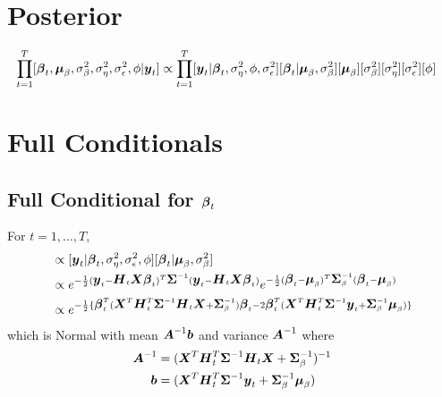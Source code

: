 \documentclass[fleqn]{article}
\def\bm#1{\mbox{\boldmath $#1$}}
\begin{document}
%
\section{Posterior}
%
\begin{align*}
\prod_{t = 1}^T [\bm{\beta}_t, \bm{\mu}_\beta, \sigma^2_\beta, \sigma^2_\eta, \sigma^2_\epsilon, \phi | \bm{y}_t] & \propto \prod_{t = 1}^T [\bm{y}_t | \bm{\beta}_t, \sigma^2_\eta, \phi, \sigma^2_\epsilon] [\bm{\beta}_t | \bm{\mu}_\beta, \sigma^2_\beta] [\bm{\mu}_\beta] [\sigma^2_\beta] [\sigma^2_\eta] [\sigma^2_\epsilon] [\phi]
\end{align*}
%
\section{Full Conditionals}
%
\subsection{Full Conditional for $\bm{\beta}_t$}
%
For $t = 1, \ldots, T$,
\begin{align*}
[\bm{\beta}_t | \cdot] & \propto [\bm{y}_t | \bm{\beta}_t, \sigma^2_\eta, \sigma^2_\epsilon, \phi] [\bm{\beta}_t | \bm{\mu}_\beta, \sigma^2_\beta]\\
%
& \propto e^{ - \frac{1} {2} (\bm{y}_t - \bm{H}_t \bm{X} \bm{\beta}_t)^T \bm{\Sigma}^{ - 1} (\bm{y}_t - \bm{H}_t \bm{X} \bm{\beta}_t)} e^{ - \frac{1} {2} (\bm{\beta}_t - \bm{\mu}_\beta)^T \bm{\Sigma}_\beta^{ - 1} (\bm{\beta}_t - \bm{\mu}_\beta)}\\
%
& \propto e^{ - \frac{1} {2} \{\bm{\beta}_t^T (\bm{X}^T \bm{H}_t^T \bm{\Sigma}^{ - 1} \bm{H}_t \bm{X} + \bm{\Sigma}_\beta^{ - 1}) \bm{\beta}_t - 2 \bm{\beta}_t^T (\bm{X}^T \bm{H}_t^T \bm{\Sigma}^{ - 1} \bm{y}_t + \bm{\Sigma}_\beta^{ - 1} \bm{\mu}_\beta) \} }
\end{align*}
%
which is Normal with mean $ \bm{A}^{ - 1} \bm{b}$ and variance $\bm{A}^{ - 1}$ where
\begin{align*}
  \bm{A}^{ - 1} & = (\bm{X}^T \bm{H}_t^T \bm{\Sigma}^{ - 1} \bm{H}_t \bm{X} + \bm{\Sigma}_\beta^{ - 1})^{ - 1}\\
  \bm{b} & = (\bm{X}^T \bm{H}_t^T \bm{\Sigma}^{ - 1} \bm{y}_t + \bm{\Sigma}_\beta^{ - 1} \bm{\mu}_\beta)\\
\end{align*}
%
\end{document}
